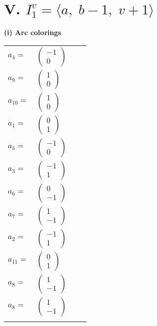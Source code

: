 \documentclass[1p]{elsarticle_modified}
\theoremstyle{definition}
\begin{document}
\centering \section*{V. $I^v_{1}= \langle a,\;b-1,\;v+1 \rangle$}
\flushleft \textbf{(i) Arc colorings}\\
\begin{tabular}{m{7pt} m{180pt} m{7pt} m{180pt} }
\flushright $a_{4}=$&$\begin{pmatrix}-1\\0\end{pmatrix}$ \\
\flushright $a_{9}=$&$\begin{pmatrix}1\\0\end{pmatrix}$ \\
\flushright $a_{10}=$&$\begin{pmatrix}1\\0\end{pmatrix}$ \\
\flushright $a_{1}=$&$\begin{pmatrix}0\\1\end{pmatrix}$ \\
\flushright $a_{5}=$&$\begin{pmatrix}-1\\0\end{pmatrix}$ \\
\flushright $a_{3}=$&$\begin{pmatrix}-1\\1\end{pmatrix}$ \\
\flushright $a_{6}=$&$\begin{pmatrix}0\\-1\end{pmatrix}$ \\
\flushright $a_{7}=$&$\begin{pmatrix}1\\-1\end{pmatrix}$ \\
\flushright $a_{2}=$&$\begin{pmatrix}-1\\1\end{pmatrix}$ \\
\flushright $a_{11}=$&$\begin{pmatrix}0\\1\end{pmatrix}$ \\
\flushright $a_{8}=$&$\begin{pmatrix}1\\-1\end{pmatrix}$\\ \flushright $a_{8}=$&$\begin{pmatrix}1\\-1\end{pmatrix}$\\&\end{tabular}
\end{document}
